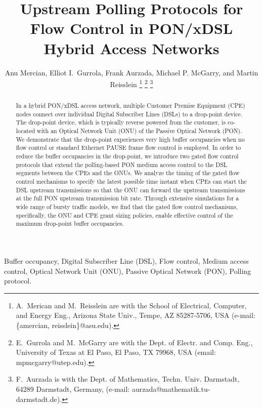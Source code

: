 \documentclass[pdftex,journal]{IEEEtran}
\title{Upstream Polling Protocols for Flow Control in
PON/xDSL Hybrid Access Networks}
\author{Anu Mercian, Elliot I.~Gurrola, Frank Aurzada, Michael P. McGarry,
 and Martin Reisslein
\thanks{A.~Merican and M.~Reisslein are with the School of Electrical,
Computer,
and  Energy Eng., Arizona State Univ., Tempe, AZ 85287-5706, USA
(e-mail: \{amercian, reisslein\}@asu.edu).}
\thanks{E.~Gurrola and M.~McGarry are with the Dept. of Electr. and Comp.
Eng., University of Texas at El Paso, El Paso, TX 79968, USA
(email: mpmcgarry@utep.edu).}
\thanks{F.~Aurzada is with the Dept. of Mathematics,
Techn. Univ. Darmstadt, 64289 Darmstadt, Germany,
(e-mail: aurzada@mathematik.tu-darmstadt.de).}}
\begin{document}
\maketitle

\begin{abstract}
In a hybrid PON/xDSL access network, multiple Customer Premise Equipment (CPE)
nodes connect over individual Digital Subscriber Lines (DSLs) to a
drop-point device. The drop-point device, which is typically
reverse powered from the customer, is co-located with
an Optical Network Unit (ONU) of the Passive Optical Network (PON).
We demonstrate that the drop-point experiences
very high buffer occupancies when no flow control or standard
Ethernet PAUSE frame flow control is employed.
In order to reduce the buffer occupancies in the drop-point,
we introduce two gated flow control protocols that extend the
polling-based PON medium access control to the DSL segments between
the CPEs and the ONUs.
We analyze the timing of the gated flow control mechanisms to
specify the latest possible time instant when CPEs can start the DSL
upstream transmissions so that the ONU can forward the upstream
transmissions at the full PON upstream transmission bit rate.
Through extensive simulations for a wide range of bursty traffic models,
we find that the gated flow control mechanisms, specifically, the
ONU and CPE grant sizing policies, enable effective control of the maximum
drop-point buffer occupancies.
\end{abstract}

\begin{keywords}
Buffer occupancy, Digital Subscriber Line (DSL), Flow control,
Medium access control, Optical Network Unit (ONU),
Passive Optical Network (PON), Polling protocol.
\end{keywords}
\end{document}
